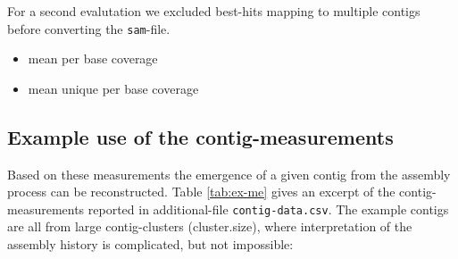 \documentclass[12pt,a4paper]{article}
\begin{document}
For a second evalutation we excluded best-hits mapping to multiple
contigs before converting the \texttt{sam}-file. 
\begin{itemize}
\item mean per base coverage
\item mean unique per base coverage

\end{itemize}

\subsection{Example use of the contig-measurements}


Based on these measurements the emergence of a given contig from the
assembly process can be reconstructed. Table \ref{tab:ex-me} gives an
excerpt of the contig-measurements reported in additional-file
\texttt{contig-data.csv}. The example contigs are all from large
contig-clusters (cluster.size), where interpretation of the assembly
history is complicated, but not impossible:
\end{document}
